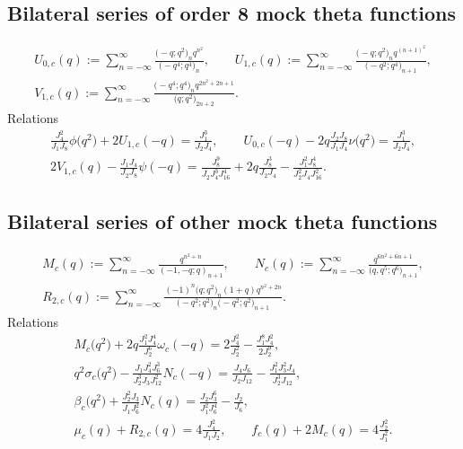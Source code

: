 \documentclass[pdftex]{sigma}
\numberwithin{equation}{section}
\begin{document}
\subsection{Bilateral series of order 8 mock theta functions}

\begin{gather*}
U_{0,c}(q):= \sum_{n=-\infty}^{\infty}\frac{\bigl(-q;q^2\bigr)_nq^{n^2}}{\bigl(-q^4;q^4\bigr)_n},\qquad
 U_{1,c}(q):= \sum_{n=-\infty}^{\infty}\frac{\bigl(-q;q^2\bigr)_nq^{(n+1)^2}}
{\bigl(-q^2;q^4\bigr)_{n+1}},\\
V_{1,c}(q):= \sum_{n=-\infty}^{\infty}\frac{\bigl(-q^4;q^4\bigr)_n q^{2n^2+2n+1}}{\bigl(q;q^2\bigr)_{2n+2}}.
\end{gather*}
Relations
\begin{gather*}
 \frac{J_4^2}{J_1J_8}\phi\bigl(q^2\bigr)+2U_{1,c}(-q)=\frac{J_1^3}{J_2J_4},\qquad
 U_{0,c}(-q)-2q\frac{J_2J_8}{J_1J_4}\nu\bigl(q^2\bigr)=\frac{J_1^3}{J_2J_4},\\
 2V_{1,c}(q)-\frac{J_1J_4}{J_2J_8}\psi(-q)=\frac{J_8^9}{J_2J_4^3J_{16}^4}+2q\frac{J_8^3}{J_2J_4}-\frac{J_1^2J_8^4}{J_2^2J_4J_{16}^2}.
\end{gather*}

\subsection{Bilateral series of other mock theta functions}
\begin{gather*}
M_c(q):= \sum_{n=-\infty}^{\infty}\frac{q^{n^2+n}}{(-1,-q;q)_{n+1}},\qquad
N_c(q):=\sum_{n=-\infty}^{\infty}\frac{q^{6n^2+6n+1}}{\bigl(q,q^5;q^6\bigr)_{n+1}},\\
R_{2,c}(q):= \sum_{n=-\infty}^{\infty}\frac{(-1)^n\bigl(q;q^2\bigr)_n(1+q)q^{n^2+2n}}
{\bigl(-q^2;q^2\bigr)_n\bigl(-q^2;q^2\bigr)_{n+1}}.
\end{gather*}
Relations
\begin{gather*}
 M_c\bigl(q^2\bigr)+2q\frac{J_1^2J_4^4}{J_2^6}\omega_c(-q)
=2\frac{J_4^2}{J_2^2}-\frac{J_1^8J_4^2}{2J_2^9},\\
 q^2\sigma_c\bigl(q^2\bigr)-\frac{J_1J_4^2J_6^3}{J_2^3J_3J_{12}^2}N_c(-q)
=\frac{J_4J_6}{J_2J_{12}}-\frac{J_1^2J_3^2J_4}{J_2^3J_{12}},\\
 \beta_c\bigl(q^2\bigr)+\frac{J_2^2J_3}{J_1J_6^2}N_c(q)
=\frac{J_2J_3^6}{J_1^2J_6^4}-\frac{J_2}{J_6},\\
 \mu_c(q)+R_{2,c}(q)=4\frac{J_4^2}{J_1J_2},\qquad
 f_c(q)+2M_c(q)=4\frac{J_2^2}{J_1^2}.
\end{gather*}
\end{document}
